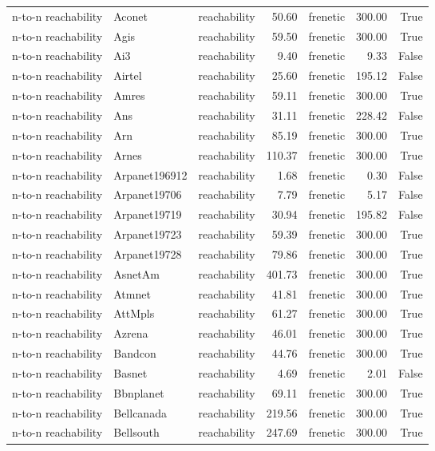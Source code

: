 \begin{tabular}{lllrlrr}
n-to-n reachability & Aconet & reachability & 50.60 & frenetic & 300.00 & True \\
n-to-n reachability & Agis & reachability & 59.50 & frenetic & 300.00 & True \\
n-to-n reachability & Ai3 & reachability & 9.40 & frenetic & 9.33 & False \\
n-to-n reachability & Airtel & reachability & 25.60 & frenetic & 195.12 & False \\
n-to-n reachability & Amres & reachability & 59.11 & frenetic & 300.00 & True \\
n-to-n reachability & Ans & reachability & 31.11 & frenetic & 228.42 & False \\
n-to-n reachability & Arn & reachability & 85.19 & frenetic & 300.00 & True \\
n-to-n reachability & Arnes & reachability & 110.37 & frenetic & 300.00 & True \\
n-to-n reachability & Arpanet196912 & reachability & 1.68 & frenetic & 0.30 & False \\
n-to-n reachability & Arpanet19706 & reachability & 7.79 & frenetic & 5.17 & False \\
n-to-n reachability & Arpanet19719 & reachability & 30.94 & frenetic & 195.82 & False \\
n-to-n reachability & Arpanet19723 & reachability & 59.39 & frenetic & 300.00 & True \\
n-to-n reachability & Arpanet19728 & reachability & 79.86 & frenetic & 300.00 & True \\
n-to-n reachability & AsnetAm & reachability & 401.73 & frenetic & 300.00 & True \\
n-to-n reachability & Atmnet & reachability & 41.81 & frenetic & 300.00 & True \\
n-to-n reachability & AttMpls & reachability & 61.27 & frenetic & 300.00 & True \\
n-to-n reachability & Azrena & reachability & 46.01 & frenetic & 300.00 & True \\
n-to-n reachability & Bandcon & reachability & 44.76 & frenetic & 300.00 & True \\
n-to-n reachability & Basnet & reachability & 4.69 & frenetic & 2.01 & False \\
n-to-n reachability & Bbnplanet & reachability & 69.11 & frenetic & 300.00 & True \\
n-to-n reachability & Bellcanada & reachability & 219.56 & frenetic & 300.00 & True \\
n-to-n reachability & Bellsouth & reachability & 247.69 & frenetic & 300.00 & True \\

\end{tabular}
